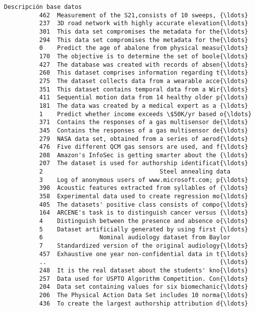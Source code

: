 \documentclass[11pt]{article}
\begin{document}
\begin{Verbatim}[commandchars=\\\{\}]
                                          Descripción base datos  
          462  Measurement of the S21,consists of 10 sweeps, {\ldots}  
          237  3D road network with highly accurate elevation{\ldots}  
          301  This data set compromises the metadata for the{\ldots}  
          294  This data set compromises the metadata for the{\ldots}  
          0    Predict the age of abalone from physical measu{\ldots}  
          170  The objective is to determine the set of boole{\ldots}  
          427  The database was created with records of absen{\ldots}  
          260  This dataset comprises information regarding t{\ldots}  
          275  The dataset collects data from a wearable acce{\ldots}  
          351  This dataset contains temporal data from a Wir{\ldots}  
          411  Sequential motion data from 14 healthy older p{\ldots}  
          181  The data was created by a medical expert as a {\ldots}  
          1    Predict whether income exceeds \$50K/yr based o{\ldots}  
          371  Contains the responses of a gas multisensor de{\ldots}  
          345  Contains the responses of a gas multisensor de{\ldots}  
          279  NASA data set, obtained from a series of aerod{\ldots}  
          476  Five different QCM gas sensors are used, and f{\ldots}  
          208  Amazon's InfoSec is getting smarter about the {\ldots}  
          207  The dataset is used for authorship identificat{\ldots}  
          2                                 Steel annealing data  
          3    Log of anonymous users of www.microsoft.com; p{\ldots}  
          390  Acoustic features extracted from syllables of {\ldots}  
          358  Experimental data used to create regression mo{\ldots}  
          405  The datasets' positive class consists of compo{\ldots}  
          164  ARCENE's task is to distinguish cancer versus {\ldots}  
          4    Distinguish between the presence and absence o{\ldots}  
          5    Dataset artificially generated by using first {\ldots}  
          6                Nominal audiology dataset from Baylor  
          7    Standardized version of the original audiology{\ldots}  
          457  Exhaustive one year non-confidential data in t{\ldots}  
          ..                                                 {\ldots}  
          248  It is the real dataset about the students' kno{\ldots}  
          257  Data used for USPTO Algorithm Competition. Con{\ldots}  
          204  Data set containing values for six biomechanic{\ldots}  
          206  The Physical Action Data Set includes 10 norma{\ldots}  
          436  To create the largest authorship attribution d{\ldots}  

\end{Verbatim}
\end{document}
